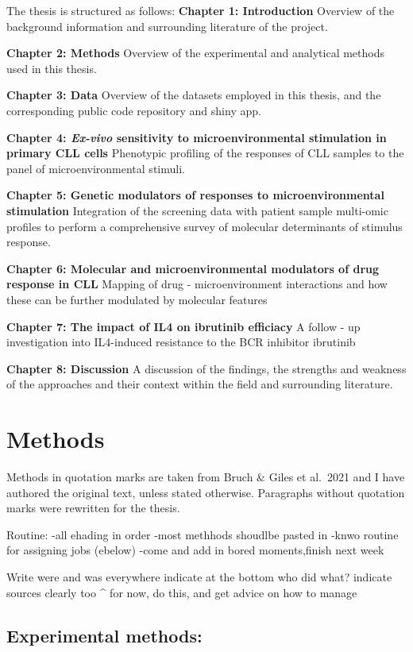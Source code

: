 \documentclass[11pt, a4paper, twosided]{book}
\begin{document}
The thesis is structured as follows:
\textbf{Chapter 1: Introduction} Overview of the background information and surrounding literature of the project.

\textbf{Chapter 2: Methods} Overview of the experimental and analytical methods used in this thesis.

\textbf{Chapter 3: Data} Overview of the datasets employed in this thesis, and the corresponding public code repository and shiny app.

\textbf{Chapter 4: \emph{Ex-vivo} sensitivity to microenvironmental stimulation in primary CLL cells }
Phenotypic profiling of the responses of CLL samples to the panel of microenvironmental stimuli.

\textbf{Chapter 5: Genetic modulators of responses to microenvironmental stimulation} Integration of the screening data with patient sample multi-omic profiles to perform a comprehensive survey of molecular determinants of stimulus response.

\textbf{Chapter 6: Molecular and microenvironmental modulators of drug response in CLL} Mapping of drug - microenvironment interactions and how these can be further modulated by molecular features

\textbf{Chapter 7: The impact of IL4 on ibrutinib efficiacy } A follow - up investigation into IL4-induced resistance to the BCR inhibitor ibrutinib

\textbf{Chapter 8: Discussion } A discussion of the findings, the strengths and weakness of the approaches and their context within the field and surrounding literature.

\hypertarget{methods}{%
\chapter{Methods}\label{methods}}

Methods in quotation marks are taken from Bruch \& Giles et al.~2021 and I have authored the original text, unless stated otherwise. Paragraphs without quotation marks were rewritten for the thesis.

Routine:
-all ehading in order
-most methhods shoudlbe pasted in
-knwo routine for assigning jobs (ebelow)
-come and add in bored moments,finish next week

Write were and was everywhere
indicate at the bottom who did what?
indicate sources clearly too
\^{} for now, do this, and get advice on how to manage

\hypertarget{experimental-methods}{%
\section{Experimental methods:}\label{experimental-methods}}
\end{document}
